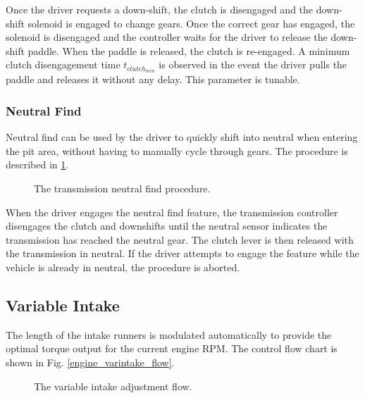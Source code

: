 Once the driver requests a down-shift, the clutch is disengaged and the down-shift solenoid is engaged to change gears. Once the correct gear has engaged, the solenoid is disengaged and the controller waits for the driver to release the down-shift paddle. When the paddle is released, the clutch is re-engaged. A minimum clutch disengagement time $t_{clutch_{min}}$ is observed in the event the driver pulls the paddle and releases it without any delay. This parameter is tunable.


\subsubsection{Neutral Find}

Neutral find can be used by the driver to quickly shift into neutral when entering the pit area, without having to manually cycle through gears. The procedure is described in \ref{fig:transmission_neutralfind_flow}.

\begin{figure}[H]
	\centering
%	
	\caption{The transmission neutral find procedure.}
	\label{fig:transmission_neutralfind_flow}
\end{figure}

When the driver engages the neutral find feature, the transmission controller disengages the clutch and downshifts until the neutral sensor indicates the transmission has reached the neutral gear. The clutch lever is then released with the transmission in neutral. If the driver attempts to engage the feature while the vehicle is already in neutral, the procedure is aborted.

\subsection{Variable Intake}

The length of the intake runners is modulated automatically to provide the optimal torque output for the current engine RPM. The control flow chart is shown in Fig. \ref{engine_varintake_flow}. 
\begin{figure}[H]
	\centering
%	
	\caption{The variable intake adjustment flow.}
	\label{fig:engine_varintake_flow}
\end{figure}

